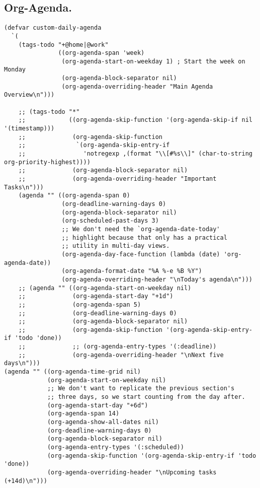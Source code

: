 \documentclass[11pt]{article}
\begin{document}
\subsection{Org-Agenda.}
\label{sec:org63a967c}
\begin{verbatim}
(defvar custom-daily-agenda
  `(
    (tags-todo "+@home|@work"
               ((org-agenda-span 'week)
                (org-agenda-start-on-weekday 1) ; Start the week on Monday
                (org-agenda-block-separator nil)
                (org-agenda-overriding-header "Main Agenda Overview\n")))

    ;; (tags-todo "*"
    ;;            ((org-agenda-skip-function '(org-agenda-skip-if nil '(timestamp)))
    ;;             (org-agenda-skip-function
    ;;              `(org-agenda-skip-entry-if
    ;;                'notregexp ,(format "\\[#%s\\]" (char-to-string org-priority-highest))))
    ;;             (org-agenda-block-separator nil)
    ;;             (org-agenda-overriding-header "Important Tasks\n")))
    (agenda "" ((org-agenda-span 0)
                (org-deadline-warning-days 0)
                (org-agenda-block-separator nil)
                (org-scheduled-past-days 3)
                ;; We don't need the `org-agenda-date-today'
                ;; highlight because that only has a practical
                ;; utility in multi-day views.
                (org-agenda-day-face-function (lambda (date) 'org-agenda-date))
                (org-agenda-format-date "%A %-e %B %Y")
                (org-agenda-overriding-header "\nToday's agenda\n")))
    ;; (agenda "" ((org-agenda-start-on-weekday nil)
    ;;             (org-agenda-start-day "+1d")
    ;;             (org-agenda-span 5)
    ;;             (org-deadline-warning-days 0)
    ;;             (org-agenda-block-separator nil)
    ;;             (org-agenda-skip-function '(org-agenda-skip-entry-if 'todo 'done))
    ;;             ;; (org-agenda-entry-types '(:deadline))
    ;;             (org-agenda-overriding-header "\nNext five days\n")))
(agenda "" ((org-agenda-time-grid nil)
            (org-agenda-start-on-weekday nil)
            ;; We don't want to replicate the previous section's
            ;; three days, so we start counting from the day after.
            (org-agenda-start-day "+6d")
            (org-agenda-span 14)
            (org-agenda-show-all-dates nil)
            (org-deadline-warning-days 0)
            (org-agenda-block-separator nil)
            (org-agenda-entry-types '(:scheduled))
            (org-agenda-skip-function '(org-agenda-skip-entry-if 'todo 'done))
            (org-agenda-overriding-header "\nUpcoming tasks (+14d)\n")))


\end{verbatim}
\end{document}
